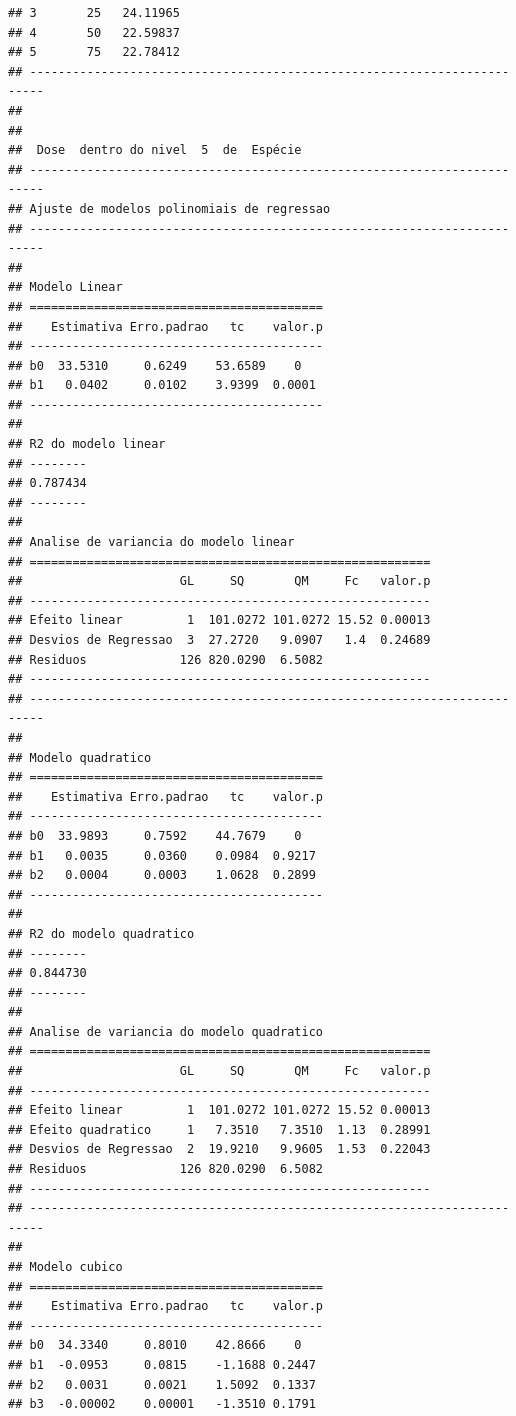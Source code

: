 \documentclass[
]{article}
\begin{document}
\begin{verbatim}
## 3       25   24.11965
## 4       50   22.59837
## 5       75   22.78412
## ------------------------------------------------------------------------
## 
## 
##  Dose  dentro do nivel  5  de  Espécie 
## ------------------------------------------------------------------------
## Ajuste de modelos polinomiais de regressao
## ------------------------------------------------------------------------
## 
## Modelo Linear
## =========================================
##    Estimativa Erro.padrao   tc    valor.p
## -----------------------------------------
## b0  33.5310     0.6249    53.6589    0   
## b1   0.0402     0.0102    3.9399  0.0001 
## -----------------------------------------
## 
## R2 do modelo linear
## --------
## 0.787434
## --------
## 
## Analise de variancia do modelo linear
## ========================================================
##                      GL     SQ       QM     Fc   valor.p
## --------------------------------------------------------
## Efeito linear         1  101.0272 101.0272 15.52 0.00013
## Desvios de Regressao  3  27.2720   9.0907   1.4  0.24689
## Residuos             126 820.0290  6.5082               
## --------------------------------------------------------
## ------------------------------------------------------------------------
## 
## Modelo quadratico
## =========================================
##    Estimativa Erro.padrao   tc    valor.p
## -----------------------------------------
## b0  33.9893     0.7592    44.7679    0   
## b1   0.0035     0.0360    0.0984  0.9217 
## b2   0.0004     0.0003    1.0628  0.2899 
## -----------------------------------------
## 
## R2 do modelo quadratico
## --------
## 0.844730
## --------
## 
## Analise de variancia do modelo quadratico
## ========================================================
##                      GL     SQ       QM     Fc   valor.p
## --------------------------------------------------------
## Efeito linear         1  101.0272 101.0272 15.52 0.00013
## Efeito quadratico     1   7.3510   7.3510  1.13  0.28991
## Desvios de Regressao  2  19.9210   9.9605  1.53  0.22043
## Residuos             126 820.0290  6.5082               
## --------------------------------------------------------
## ------------------------------------------------------------------------
## 
## Modelo cubico
## =========================================
##    Estimativa Erro.padrao   tc    valor.p
## -----------------------------------------
## b0  34.3340     0.8010    42.8666    0   
## b1  -0.0953     0.0815    -1.1688 0.2447 
## b2   0.0031     0.0021    1.5092  0.1337 
## b3  -0.00002    0.00001   -1.3510 0.1791 

\end{verbatim}
\end{document}
